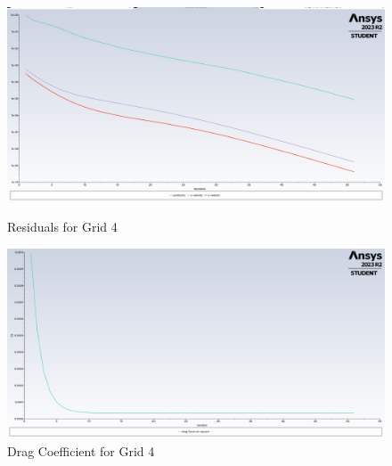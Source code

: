 \begin{figure}[H]
    \centering
    \begin{minipage}{0.45\textwidth}
        \centering
        \includegraphics[width=\textwidth]{Questions/Figures/residuals grid 4.png}
        \caption{Residuals for Grid 4}
        \label{fig:residuals_grid_4}
    \end{minipage}
    \begin{minipage}{0.45\textwidth}
        \centering
        \includegraphics[width=\textwidth]{Questions/Figures/drag force on square grid 4.png}
        \caption{Drag Coefficient for Grid 4}
        \label{fig:drag_coefficient_grid_4}
    \end{minipage}
\end{figure}
